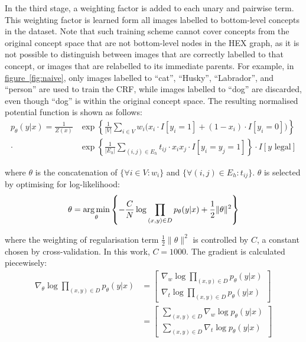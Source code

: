 \documentclass[11pt,a4paper]{article}
\newcommand{\argmin}{\operatornamewithlimits{arg\,min}}
\begin{document}
In the third stage, a weighting factor is added to each unary and pairwise term. This weighting factor is learned form all images labelled to bottom-level concepts in the dataset. Note that such training scheme cannot cover concepts from the original concept space that are not bottom-level nodes in the HEX graph, as it is not possible to distinguish between images that are correctly labelled to that concept, or images that are relabelled to its immediate parents. For example, in \hyperref[fig:naive]{figure~\ref{fig:naive}}, only images labelled to ``cat'', ``Husky'', ``Labrador'', and ``person'' are used to train the CRF, while images labelled to ``dog'' are discarded, even though ``dog'' is within the original concept space. The resulting normalised potential function is shown as follows:
\begin{align}
p_\theta(y|x)=\frac{1}{Z(x)}&\exp\left\{\frac{1}{|V|}\sum_{i\in V}w_i\big(x_i\cdot I[y_i=1]+(1-x_i)\cdot I[y_i=0]\big)\right\}\nonumber\\
\cdot&\exp\left\{\frac{1}{|E_h|}\sum_{(i,j)\in E_h}t_{ij}\cdot x_ix_j\cdot I[y_i=y_j=1]\right\}\cdot I[y\text{ legal}]
\end{align}

where $\theta$ is the concatenation of $\{\forall i\in V:w_i\}$ and $\{\forall(i,j)\in E_h:t_{ij}\}$. $\theta$ is selected by optimising for log-likelihood:
\begin{equation}
\theta=\argmin_\theta\left\{-\frac{C}{N}\log\prod_{(x,y)\in D}p_\theta(y|x)+\frac{1}{2}\|\theta\|^2\right\}
\end{equation}

where the weighting of regularisation term $\frac{1}{2}\|\theta\|^2$ is controlled by $C$, a constant chosen by cross-validation. In this work, $C=1000$. The gradient is calculated piecewisely:
\begin{align}
\nabla_\theta\log\prod_{(x,y)\in D}p_\theta(y|x)&=\begin{bmatrix}
\nabla_w\log\prod_{(x,y)\in D}p_\theta(y|x)\\ 
\nabla_t\log\prod_{(x,y)\in D}p_\theta(y|x)
\end{bmatrix}\nonumber\\
&=\begin{bmatrix}
\sum_{(x,y)\in D}\nabla_w\log p_\theta(y|x)\\ 
\sum_{(x,y)\in D}\nabla_t\log p_\theta(y|x)
\end{bmatrix}
\label{eqn:nablatheta}
\end{align}
\end{document}
